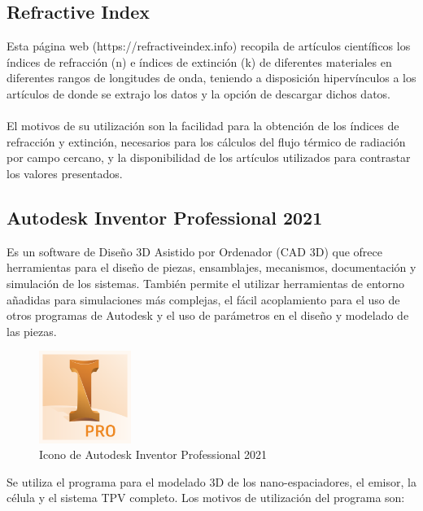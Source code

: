 \subsection{Refractive Index}
Esta página web (https://refractiveindex.info) recopila de artículos científicos los índices de refracción (n) e índices de extinción (k) de diferentes materiales en diferentes rangos de longitudes de onda, teniendo a disposición hipervínculos a los artículos de donde se extrajo los datos y la opción de descargar dichos datos.\\\\
El motivos de su utilización son la facilidad para la obtención de los índices de refracción y extinción, necesarios para los cálculos del flujo térmico de radiación por campo cercano, y la disponibilidad de los artículos utilizados para contrastar los valores presentados.

\subsection{Autodesk Inventor Professional 2021}
Es un software de Diseño 3D Asistido por Ordenador (CAD 3D) que ofrece herramientas para el diseño de piezas, ensamblajes, mecanismos, documentación y simulación de los sistemas. También permite el utilizar herramientas de entorno añadidas para simulaciones más complejas, el fácil acoplamiento para el uso de otros programas de Autodesk y el uso de parámetros en el diseño y modelado de las piezas.
\begin{figure}[H]
	\centering
		\includegraphics[width=3cm]{figuras/inventorpro.png}
	\caption{Icono de Autodesk Inventor Professional 2021}
	\label{fig:inventorpro}
\end{figure}
Se utiliza el programa para el modelado 3D de los nano-espaciadores, el emisor, la célula y el sistema TPV completo. Los motivos de utilización del programa son:

